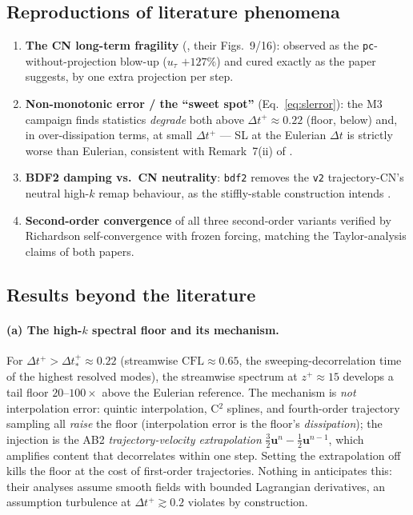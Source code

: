 \documentclass[11pt,a4paper]{article}
\newcommand{\ut}{u_\tau}
\newcommand{\dtp}{\Delta t^{+}}
\newcommand{\bu}{\mathbf{u}}
\begin{document}
\subsection{Reproductions of literature phenomena}
\label{sec:repro}

\begin{enumerate}
\item \textbf{The CN long-term fragility} (\cite{xiu01}, their Figs.~9/16):
observed as the \texttt{pc}-without-projection blow-up
($\ut$ $+127\%$) and cured exactly as the paper suggests, by one extra
projection per step.
\item \textbf{Non-monotonic error / the ``sweet spot''}
(Eq.~\ref{eq:slerror}): the M3 campaign finds statistics \emph{degrade} both
above $\dtp\approx0.22$ (floor, below) and, in over-dissipation terms, at
small $\dtp$ --- SL at the Eulerian $\Delta t$ is strictly worse than
Eulerian, consistent with Remark~7(ii) of \cite{boukir97}.
\item \textbf{BDF2 damping vs.\ CN neutrality}: \texttt{bdf2} removes the
\texttt{v2} trajectory-CN's neutral high-$k$ remap behaviour, as the
stiffly-stable construction intends \cite{xiu01,boukir97}.
\item \textbf{Second-order convergence} of all three second-order variants
verified by Richardson self-convergence with frozen forcing, matching the
Taylor-analysis claims of both papers.
\end{enumerate}

\subsection{Results beyond the literature}
\label{sec:beyond}

\paragraph{(a) The high-$k$ spectral floor and its mechanism.} For
$\dtp > \dtp_{*}\approx0.22$ (streamwise $\mathrm{CFL}\approx0.65$, the
sweeping-decorrelation time of the highest resolved modes), the streamwise
spectrum at $z^{+}\approx15$ develops a tail floor $20$--$100\times$ above
the Eulerian reference. The mechanism is \emph{not} interpolation error:
quintic interpolation, C$^2$ splines, and fourth-order trajectory sampling
all \emph{raise} the floor (interpolation error is the floor's
\emph{dissipation}); the injection is the AB2 \emph{trajectory-velocity
extrapolation} $\tfrac32\bu^{n}-\tfrac12\bu^{n-1}$, which amplifies content
that decorrelates within one step. Setting the extrapolation off kills the
floor at the cost of first-order trajectories. Nothing in
\cite{boukir97,xiu01,xu02,xiu05} anticipates this: their analyses assume
smooth fields with bounded Lagrangian derivatives, an assumption turbulence
at $\dtp\gtrsim0.2$ violates by construction.
\end{document}
